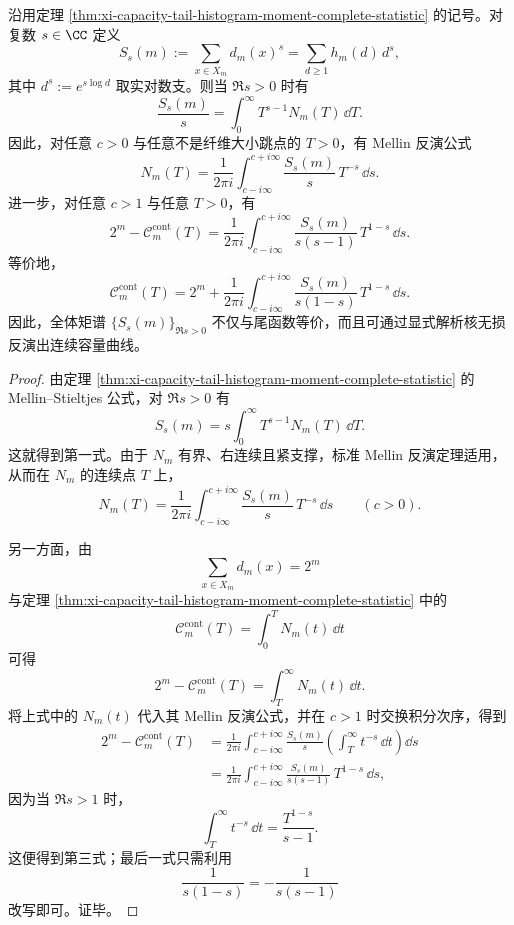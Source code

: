 \begin{theorem}\label{thm:xi-capacity-moment-mellin-inversion-tail-capacity}
沿用定理 \ref{thm:xi-capacity-tail-histogram-moment-complete-statistic} 的记号。对复数 \(s\in\CC\) 定义
\[
S_s(m):=\sum_{x\in X_m}d_m(x)^s
=
\sum_{d\ge 1}h_m(d)\,d^s,
\]
其中 \(d^s:=e^{s\log d}\) 取实对数支。则当 \(\Re s>0\) 时有
\[
\boxed{\;
\frac{S_s(m)}{s}
=
\int_0^\infty T^{s-1}N_m(T)\,\dd T.\;}
\]
因此，对任意 \(c>0\) 与任意不是纤维大小跳点的 \(T>0\)，有 Mellin 反演公式
\[
\boxed{\;
N_m(T)
=
\frac{1}{2\pi i}
\int_{c-i\infty}^{c+i\infty}
\frac{S_s(m)}{s}\,T^{-s}\,\dd s.\;}
\]
进一步，对任意 \(c>1\) 与任意 \(T>0\)，有
\[
\boxed{\;
2^m-\mathcal C_m^{\mathrm{cont}}(T)
=
\frac{1}{2\pi i}
\int_{c-i\infty}^{c+i\infty}
\frac{S_s(m)}{s(s-1)}\,T^{1-s}\,\dd s.\;}
\]
等价地，
\[
\boxed{\;
\mathcal C_m^{\mathrm{cont}}(T)
=
2^m+
\frac{1}{2\pi i}
\int_{c-i\infty}^{c+i\infty}
\frac{S_s(m)}{s(1-s)}\,T^{1-s}\,\dd s.\;}
\]
因此，全体矩谱 \(\{S_s(m)\}_{\Re s>0}\) 不仅与尾函数等价，而且可通过显式解析核无损反演出连续容量曲线。
\end{theorem}
\begin{proof}
由定理 \ref{thm:xi-capacity-tail-histogram-moment-complete-statistic} 的 Mellin--Stieltjes 公式，对 \(\Re s>0\) 有
\[
S_s(m)=s\int_0^\infty T^{s-1}N_m(T)\,\dd T.
\]
这就得到第一式。由于 \(N_m\) 有界、右连续且紧支撑，标准 Mellin 反演定理适用，从而在 \(N_m\) 的连续点 \(T\) 上，
\[
N_m(T)
=
\frac{1}{2\pi i}
\int_{c-i\infty}^{c+i\infty}
\frac{S_s(m)}{s}\,T^{-s}\,\dd s
\qquad(c>0).
\]

另一方面，由
\[
\sum_{x\in X_m}d_m(x)=2^m
\]
与定理 \ref{thm:xi-capacity-tail-histogram-moment-complete-statistic} 中的
\[
\mathcal C_m^{\mathrm{cont}}(T)=\int_0^T N_m(t)\,\dd t
\]
可得
\[
2^m-\mathcal C_m^{\mathrm{cont}}(T)=\int_T^\infty N_m(t)\,\dd t.
\]
将上式中的 \(N_m(t)\) 代入其 Mellin 反演公式，并在 \(c>1\) 时交换积分次序，得到
\[
\begin{aligned}
2^m-\mathcal C_m^{\mathrm{cont}}(T)
&=
\frac{1}{2\pi i}
\int_{c-i\infty}^{c+i\infty}
\frac{S_s(m)}{s}
\left(\int_T^\infty t^{-s}\,\dd t\right)\dd s\\
&=
\frac{1}{2\pi i}
\int_{c-i\infty}^{c+i\infty}
\frac{S_s(m)}{s(s-1)}\,T^{1-s}\,\dd s,
\end{aligned}
\]
因为当 \(\Re s>1\) 时，
\[
\int_T^\infty t^{-s}\,\dd t=\frac{T^{1-s}}{s-1}.
\]
这便得到第三式；最后一式只需利用
\[
\frac{1}{s(1-s)}=-\frac{1}{s(s-1)}
\]
改写即可。证毕。
\end{proof}

